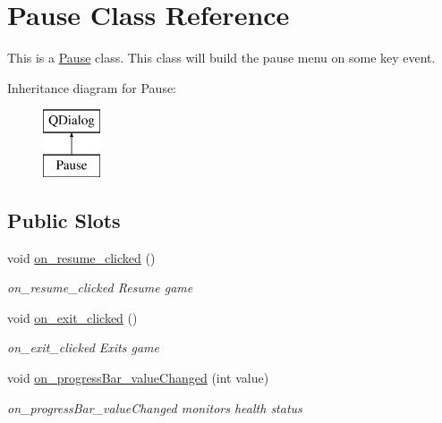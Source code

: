 \hypertarget{class_pause}{\section{Pause Class Reference}
\label{class_pause}
}


This is a \hyperlink{class_pause}{Pause} class. This class will build the pause menu on some key event.  


Inheritance diagram for Pause\-:\begin{figure}[H]
\begin{center}
\leavevmode
\includegraphics[height=2.000000cm]{class_pause}
\end{center}
\end{figure}
\subsection*{Public Slots}
\begin{DoxyCompactItemize}
\item 
void \hyperlink{class_pause_ad632066c1f745b88f328f609de26419f}{on\-\_\-resume\-\_\-clicked} ()
\begin{DoxyCompactList}\small\item\em on\-\_\-resume\-\_\-clicked Resume game \end{DoxyCompactList}\item 
void \hyperlink{class_pause_aed0cb80fa11b7556ffe285bb83696e55}{on\-\_\-exit\-\_\-clicked} ()
\begin{DoxyCompactList}\small\item\em on\-\_\-exit\-\_\-clicked Exits game \end{DoxyCompactList}\item 
\hypertarget{class_pause_a2b4c1e4ee50785bcca1dc1c422f527b3}{void \hyperlink{class_pause_a2b4c1e4ee50785bcca1dc1c422f527b3}{on\-\_\-progress\-Bar\-\_\-value\-Changed} (int value)}\label{class_pause_a2b4c1e4ee50785bcca1dc1c422f527b3}

\begin{DoxyCompactList}\small\item\em on\-\_\-progress\-Bar\-\_\-value\-Changed monitors health status \end{DoxyCompactList}\end{DoxyCompactItemize}
